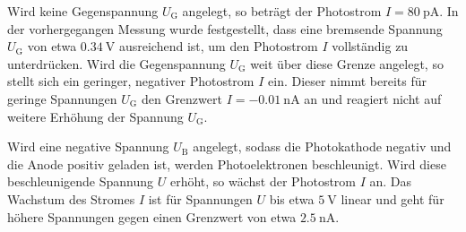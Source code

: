 Wird keine Gegenspannung $U_\text{G}$ angelegt, so beträgt der Photostrom $I = \SI{80}{\pico\ampere}$.
In der vorhergegangen Messung wurde festgestellt, dass eine bremsende Spannung $U_\text{G}$ von etwa $\SI{0.34}{\volt}$ 
ausreichend ist, um den Photostrom $I$ vollständig zu unterdrücken.
Wird die Gegenspannung $U_\text{G}$ weit über diese Grenze angelegt, so stellt sich ein geringer, negativer Photostrom $I$ ein.
Dieser nimmt bereits für geringe Spannungen $U_\text{G}$ den Grenzwert $I=\SI{-0.01}{\nano\ampere}$ an und reagiert nicht auf weitere Erhöhung der Spannung $U_\text{G}$.

Wird eine negative Spannung $U_\text{B}$ angelegt, sodass die Photokathode negativ und die Anode positiv geladen ist, 
werden Photoelektronen beschleunigt.
Wird diese beschleunigende Spannung $U$ erhöht, so wächst der Photostrom $I$ an. 
Das Wachstum des Stromes $I$ ist für Spannungen $U$ bis etwa $\SI{5}{\volt}$ linear und geht für höhere Spannungen gegen einen Grenzwert von etwa $\SI{2.5}{\nano\ampere}$.